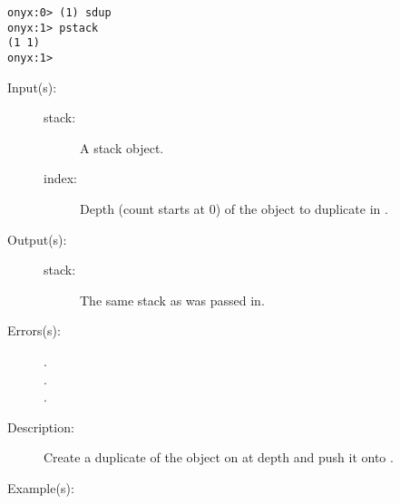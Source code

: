 \begin{description}
\begin{description}
\begin{verbatim}
onyx:0> (1) sdup
onyx:1> pstack
(1 1)
onyx:1>
		\end{verbatim}
	\end{description}
\label{systemdict:sindex}
\item[{\onyxop{stack index}{sindex}{stack}}: ]
	\begin{description}\item[]
	\item[Input(s): ]
		\begin{description}\item[]
		\item[stack: ]
			A stack object.
		\item[index: ]
			Depth (count starts at 0) of the object to duplicate in
			.
		\end{description}
	\item[Output(s): ]
		\begin{description}\item[]
		\item[stack: ]
			The same stack as was passed in.
		\end{description}
	\item[Errors(s): ]
		\begin{description}\item[]
		\item[.]
		\item[.]
		\item[.]
		\end{description}
	\item[Description: ]
		Create a duplicate of the object on  at depth
		 and push it onto .
	\item[Example(s): ]\begin{verbatim}


\end{verbatim}
\end{description}
\end{description}
